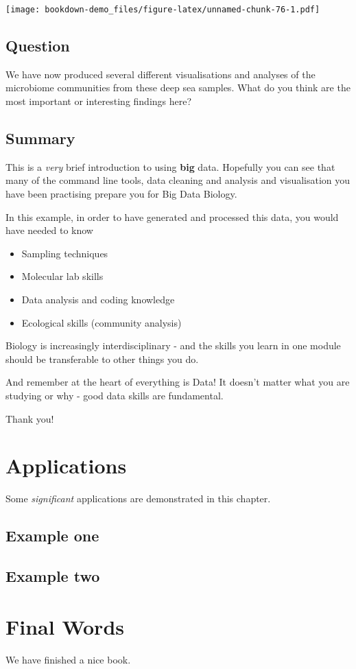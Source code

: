 \documentclass[
]{book}
\providecommand{\tightlist}{%
  \setlength{\itemsep}{0pt}\setlength{\parskip}{0pt}}
\begin{document}
\texttt{[image: bookdown-demo\_files/figure-latex/unnamed-chunk-76-1.pdf]}

\hypertarget{question}{%
\section{Question}\label{question}}

We have now produced several different visualisations and analyses of the microbiome communities from these deep sea samples.
What do you think are the most important or interesting findings here?

\hypertarget{summary-3}{%
\section{Summary}\label{summary-3}}

This is a \emph{very} brief introduction to using \textbf{big} data. Hopefully you can see that many of the command line tools, data cleaning and analysis and visualisation you have been practising prepare you for Big Data Biology.

In this example, in order to have generated and processed this data, you would have needed to know

\begin{itemize}
\tightlist
\item
  Sampling techniques
\item
  Molecular lab skills
\item
  Data analysis and coding knowledge
\item
  Ecological skills (community analysis)
\end{itemize}

Biology is increasingly interdisciplinary - and the skills you learn in one module should be transferable to other things you do.

And remember at the heart of everything is Data! It doesn't matter what you are studying or why - good data skills are fundamental.

Thank you!

\hypertarget{applications}{%
\chapter{Applications}\label{applications}}

Some \emph{significant} applications are demonstrated in this chapter.

\hypertarget{example-one}{%
\section{Example one}\label{example-one}}

\hypertarget{example-two}{%
\section{Example two}\label{example-two}}

\hypertarget{final-words}{%
\chapter{Final Words}\label{final-words}}

We have finished a nice book.

  
\end{document}
